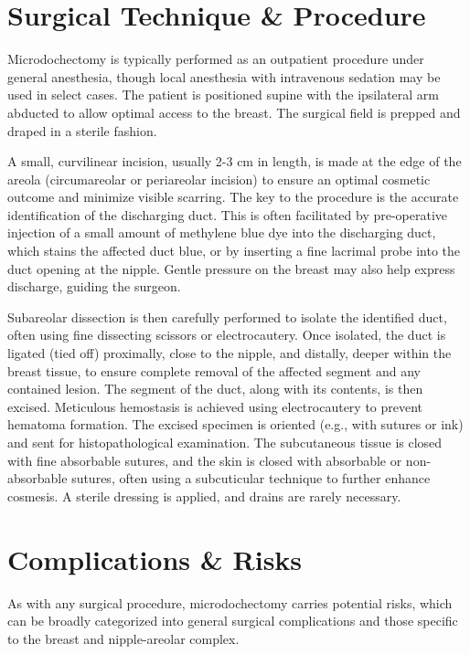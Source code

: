 \section*{Surgical Technique \& Procedure}
Microdochectomy is typically performed as an outpatient procedure under general anesthesia, though local anesthesia with intravenous sedation may be used in select cases. The patient is positioned supine with the ipsilateral arm abducted to allow optimal access to the breast. The surgical field is prepped and draped in a sterile fashion.

A small, curvilinear incision, usually 2-3 cm in length, is made at the edge of the areola (circumareolar or periareolar incision) to ensure an optimal cosmetic outcome and minimize visible scarring. The key to the procedure is the accurate identification of the discharging duct. This is often facilitated by pre-operative injection of a small amount of methylene blue dye into the discharging duct, which stains the affected duct blue, or by inserting a fine lacrimal probe into the duct opening at the nipple. Gentle pressure on the breast may also help express discharge, guiding the surgeon. 

Subareolar dissection is then carefully performed to isolate the identified duct, often using fine dissecting scissors or electrocautery. Once isolated, the duct is ligated (tied off) proximally, close to the nipple, and distally, deeper within the breast tissue, to ensure complete removal of the affected segment and any contained lesion. The segment of the duct, along with its contents, is then excised. Meticulous hemostasis is achieved using electrocautery to prevent hematoma formation. The excised specimen is oriented (e.g., with sutures or ink) and sent for histopathological examination. The subcutaneous tissue is closed with fine absorbable sutures, and the skin is closed with absorbable or non-absorbable sutures, often using a subcuticular technique to further enhance cosmesis. A sterile dressing is applied, and drains are rarely necessary.

\section*{Complications \& Risks}
As with any surgical procedure, microdochectomy carries potential risks, which can be broadly categorized into general surgical complications and those specific to the breast and nipple-areolar complex.

